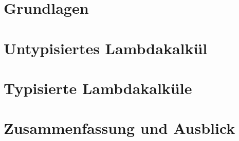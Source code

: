 \documentclass{scrbook}
\begin{document}
\tableofcontents
\newpage


\part{Grundlagen}







\part{Untypisiertes Lambdakalkül}













\part{Typisierte Lambdakalküle}

















\part{Zusammenfassung und Ausblick}

\newpage
\listoftodos
\end{document}
